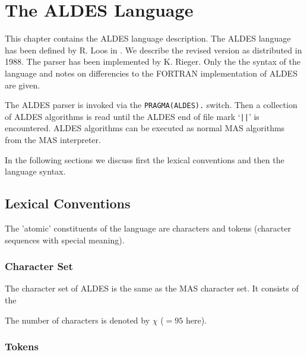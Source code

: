

\chapter{The ALDES Language}

This chapter contains the ALDES language description.
The ALDES language has been defined by R. Loos in 
\cite{Loos 76}. We describe the revised version 
as distributed in 1988.
The parser has been implemented by K. Rieger.
Only the the syntax of the language and notes on 
differencies to the FORTRAN implementation of ALDES are given.

The ALDES parser is invoked via the 
\verb/PRAGMA(ALDES)./  switch.
Then a collection of ALDES algorithms is read until 
the ALDES end of file mark `\verb/||/' is encountered.
ALDES algorithms can be executed as normal MAS algorithms 
from the MAS interpreter.

In the following sections we discuss 
first the lexical conventions and then 
the language syntax.


\section{Lexical Conventions}

The 'atomic' constituents of the language are characters and
tokens (character sequences with special meaning).


\subsection{Character Set}

The character set of ALDES is the same as the MAS character set.
It consists of the 
\begin{deflist}{letter}
\item[digits] \verb/0123456789/
\item[letters] \verb/aAbBcCdDeEfFgGhHiIjJkKlLmMnNoOpPqQrRsStTuUvVwWxXyYzZ/
\item[others] \verb*0.,=+-*/$() !"#%&':;<>?@[\]^_`{}|~0
\end{deflist}
The number of characters is denoted by $\chi$ ($=95$ here).

\subsection{Tokens}

